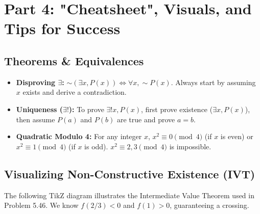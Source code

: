 \documentclass[11pt, a4paper]{article}
\theoremstyle{definition}
\theoremstyle{remark}
\begin{document}
\newpage

\section{Part 4: "Cheatsheet", Visuals, and Tips for Success}

\subsection{Theorems \& Equivalences}
\begin{itemize}
    \item \textbf{Disproving $\exists$:} $\sim(\exists x, P(x)) \iff \forall x, \sim P(x)$. Always start by assuming $x$ exists and derive a contradiction.
    \item \textbf{Uniqueness ($\exists!$):} To prove $\exists! x, P(x)$, first prove existence ($\exists x, P(x)$), then assume $P(a)$ and $P(b)$ are true and prove $a=b$.
    \item \textbf{Quadratic Modulo 4:} For any integer $x$, $x^2 \equiv 0 \pmod 4$ (if $x$ is even) or $x^2 \equiv 1 \pmod 4$ (if $x$ is odd). $x^2 \equiv 2, 3 \pmod 4$ is impossible.
\end{itemize}

\subsection{Visualizing Non-Constructive Existence (IVT)}
The following TikZ diagram illustrates the Intermediate Value Theorem used in Problem 5.46. We know $f(2/3) < 0$ and $f(1) > 0$, guaranteeing a crossing.

\begin{center}
\end{center}
\end{document}

